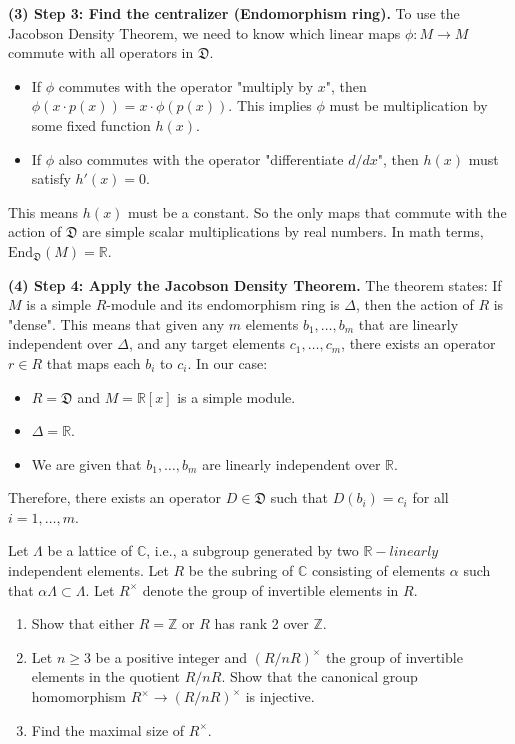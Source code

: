 \begin{solution}
\textbf{(3) Step 3: Find the centralizer (Endomorphism ring).}
To use the Jacobson Density Theorem, we need to know which linear maps $\phi: M \to M$ commute with all operators in $\mathfrak{D}$.
\begin{itemize}
    \item If $\phi$ commutes with the operator "multiply by $x$", then $\phi(x \cdot p(x)) = x \cdot \phi(p(x))$. This implies $\phi$ must be multiplication by some fixed function $h(x)$.
    \item If $\phi$ also commutes with the operator "differentiate $d/dx$", then $h(x)$ must satisfy $h'(x) = 0$.
\end{itemize}
This means $h(x)$ must be a constant. So the only maps that commute with the action of $\mathfrak{D}$ are simple scalar multiplications by real numbers. In math terms, $\text{End}_{\mathfrak{D}}(M) = \mathbb{R}$.

\textbf{(4) Step 4: Apply the Jacobson Density Theorem.}
The theorem states: If $M$ is a simple $R$-module and its endomorphism ring is $\Delta$, then the action of $R$ is "dense". This means that given any $m$ elements $b_1, \dots, b_m$ that are linearly independent over $\Delta$, and any target elements $c_1, \dots, c_m$, there exists an operator $r \in R$ that maps each $b_i$ to $c_i$.
In our case:
\begin{itemize}
    \item $R = \mathfrak{D}$ and $M = \mathbb{R}[x]$ is a simple module.
    \item $\Delta = \mathbb{R}$.
    \item We are given that $b_1, \dots, b_m$ are linearly independent over $\mathbb{R}$.
\end{itemize}
Therefore, there exists an operator $D \in \mathfrak{D}$ such that $D(b_i) = c_i$ for all $i=1, \dots, m$. 
\end{solution}

\begin{exercise}
\label{algebra:2012:5}
Let $\Lambda$ be a lattice of $\mathbb{C}$, i.e., a subgroup generated by two $\mathbb{R}-linearly$ independent elements. Let $R$ be the subring of $\mathbb{C}$ consisting of elements $\alpha$ such that $\alpha \Lambda \subset \Lambda$. Let $R^\times$ denote the group of invertible elements in $R$.
\begin{enumerate}
    \item Show that either $R = \mathbb{Z}$ or $R$ has rank 2 over $\mathbb{Z}$.
    \item Let $n \geq 3$ be a positive integer and $(R/nR)^\times$ the group of invertible elements in the quotient $R/nR$. Show that the canonical group homomorphism $R^\times \to (R/nR)^\times$ is injective.
    \item Find the maximal size of $R^\times$.
\end{enumerate}
\end{exercise}

